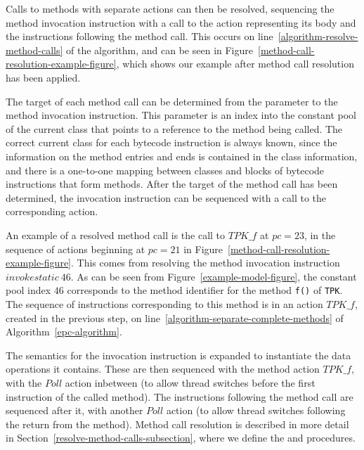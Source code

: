 Calls to methods with separate actions can then be resolved,
sequencing the method invocation instruction with a call to the
\Circus{} action representing its body and the instructions following
the method call. 
This occurs on line~\ref{algorithm-resolve-method-calls} of the
algorithm, and can be seen in
Figure~\ref{method-call-resolution-example-figure}, which shows our
example after method call resolution has been applied.

The target of each method call can be determined from the parameter to
the method invocation instruction.
This parameter is an index into the constant pool of the current class
that points to a reference to the method being called.
The correct current class for each bytecode instruction is always
known, since the information on the method entries and ends is
contained in the class information, and there is a one-to-one mapping
between classes and blocks of bytecode instructions that form methods.
After the target of the method call has been determined, the
invocation instruction can be sequenced with a call to the
corresponding \Circus{} action.

An example of a resolved method call is the call to $TPK\_f$ at
$pc = 23$, in the sequence of actions beginning at $pc = 21$ in
Figure~\ref{method-call-resolution-example-figure}. 
This comes from resolving the method invocation instruction
$invokestatic~46$.
As can be seen from Figure~\ref{example-model-figure}, the constant
pool index $46$ corresponds to the method identifier for the method
\texttt{f()} of \texttt{TPK}.
The sequence of instructions corresponding to this method is in an
action $TPK\_f$, created in the previous step, on
line~\ref{algorithm-separate-complete-methods} of
Algorithm~\ref{epc-algorithm}.

The semantics for the invocation instruction is expanded to
instantiate the data operations it contains.
These are then sequenced with the method action $TPK\_f$, with the
$Poll$ action inbetween (to allow thread switches before the first
instruction of the called method).
The instructions following the method call are sequenced after it,
with another $Poll$ action (to allow thread switches following the
return from the method).
Method call resolution is described in more detail in
Section~\ref{resolve-method-calls-subsection}, where we define the
 and 
procedures.

